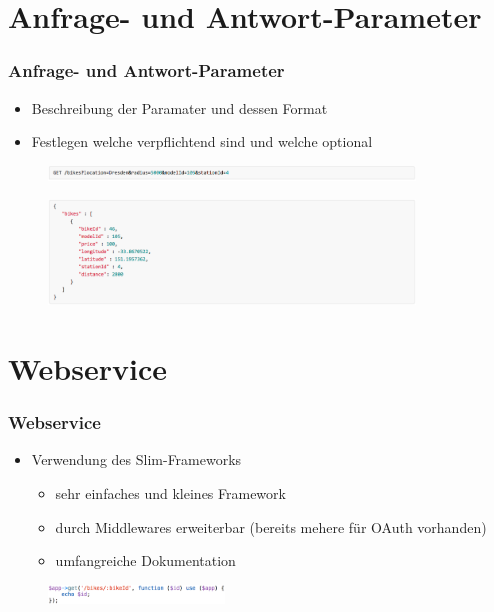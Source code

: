 \section{Anfrage- und Antwort-Parameter}
\begin{frame}
	\frametitle*{Anfrage- und Antwort-Parameter}
	\begin{itemize}
		\item Beschreibung der Paramater und dessen Format
		\item Festlegen welche verpflichtend sind und welche optional
	\end{itemize}
	\begin{figure}
		\centering
		\includegraphics[height=4mm]{pics/request_example.png}
	\end{figure}
	\begin{figure}
		\centering
		\includegraphics[height=28mm]{pics/response_example.png}
	\end{figure}
\end{frame}

\section{Webservice}
\begin{frame}
	\frametitle*{Webservice}
	\begin{itemize}
		\item Verwendung des Slim-Frameworks
		\begin{itemize}
			\item sehr einfaches und kleines Framework
			\item durch Middlewares erweiterbar (bereits mehere für OAuth vorhanden)
			\item umfangreiche Dokumentation
		\end{itemize}
	\end{itemize}
\begin{figure}
		\centering
		\includegraphics[height=5mm]{pics/slim.png}
	\end{figure}
\end{frame}

